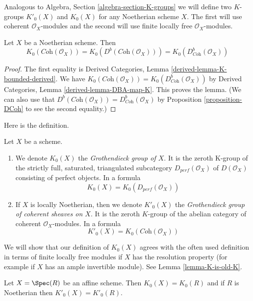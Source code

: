 \medskip\noindent
Analogous to Algebra, Section \ref{algebra-section-K-groups}
we will define two $K$-groups $K'_0(X)$ and $K_0(X)$ for any
Noetherian scheme $X$. The first will use coherent $\mathcal{O}_X$-modules
and the second will use finite locally free $\mathcal{O}_X$-modules.

\begin{lemma}
\label{lemma-Noetherian-Kprime}
Let $X$ be a Noetherian scheme. Then
$$
K_0(\textit{Coh}(\mathcal{O}_X)) =
K_0(D^b(\textit{Coh}(\mathcal{O}_X))) =
K_0(D^b_{\textit{Coh}}(\mathcal{O}_X))
$$
\end{lemma}

\begin{proof}
The first equality is
Derived Categories, Lemma \ref{derived-lemma-K-bounded-derived}.
We have $K_0(\textit{Coh}(\mathcal{O}_X)) =
K_0(D^b_{\textit{Coh}}(\mathcal{O}_X))$ by
Derived Categories, Lemma \ref{derived-lemma-DBA-map-K}.
This proves the lemma.
(We can also use that
$D^b(\textit{Coh}(\mathcal{O}_X)) = D^b_{\textit{Coh}}(\mathcal{O}_X)$
by Proposition \ref{proposition-DCoh} to see the second
equality.)
\end{proof}

\noindent
Here is the definition.

\begin{definition}
\label{definition-K-group}
Let $X$ be a scheme.
\begin{enumerate}
\item We denote $K_0(X)$ the {\it Grothendieck group of $X$}. It is the
zeroth K-group of the strictly full, saturated, triangulated subcategory
$D_{perf}(\mathcal{O}_X)$ of $D(\mathcal{O}_X)$ consisting of perfect objects.
In a formula
$$
K_0(X) = K_0(D_{perf}(\mathcal{O}_X))
$$
\item If $X$ is locally Noetherian, then we denote $K'_0(X)$ the
{\it Grothendieck group of coherent sheaves on $X$}. It is the
zeroth $K$-group of the abelian category
of coherent $\mathcal{O}_X$-modules. In a formula
$$
K'_0(X) = K_0(\textit{Coh}(\mathcal{O}_X))
$$
\end{enumerate}
\end{definition}

\noindent
We will show that our definition of $K_0(X)$ agrees with the often used
definition in terms of finite locally free modules if $X$ has the
resolution property (for example if $X$ has an ample invertible module).
See Lemma \ref{lemma-K-is-old-K}.

\begin{lemma}
\label{lemma-K-agrees-affine}
Let $X = \Spec(R)$ be an affine scheme. Then $K_0(X) = K_0(R)$
and if $R$ is Noetherian then $K'_0(X) = K'_0(R)$.
\end{lemma}

